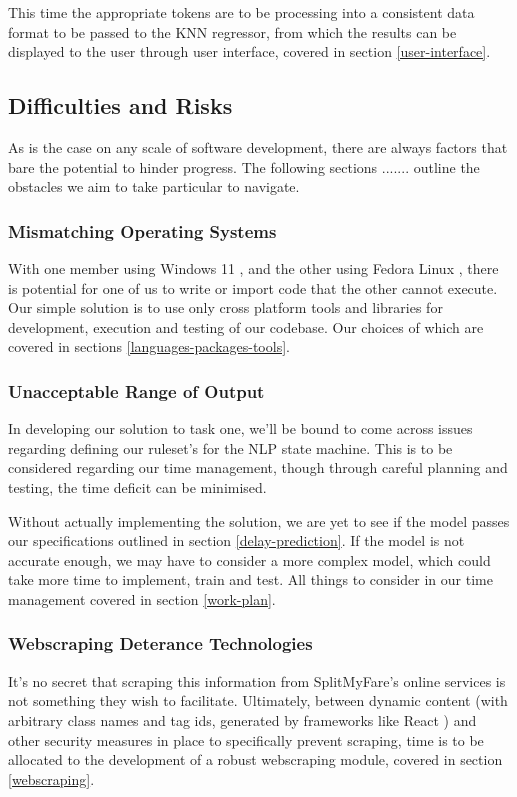 \documentclass[11pt]{article}
\newcounter{subsubsubsection}[subsubsection]
\begin{document}
This time the appropriate tokens are to be processing into a consistent data format to be passed to the KNN regressor, from which the results can be displayed to the user through user interface, covered in section \ref{user-interface}.

\subsection{Difficulties and Risks} \label{difficulties-risks}

As is the case on any scale of software development, there are always factors that bare the potential to hinder progress. The following sections ....... outline the obstacles we aim to take particular to navigate.

\subsubsection{Mismatching Operating Systems} \label{mismatching-os}

With one member using Windows 11 \cite{windows}, and the other using Fedora Linux \cite{fedora}, there is potential for one of us to write or import code that the other cannot execute. Our simple solution is to use only cross platform tools and libraries for development, execution and testing of our codebase. Our choices of which are covered in sections \ref{languages-packages-tools}.

\subsubsection{Unacceptable Range of Output} \label{unacceptable-output}

In developing our solution to task one, we'll be bound to come across issues regarding defining our ruleset's for the NLP state machine. This is to be considered regarding our time management, though through careful planning and testing, the time deficit can be minimised.

Without actually implementing the solution, we are yet to see if the model passes our specifications outlined in section \ref{delay-prediction}. If the model is not accurate enough, we may have to consider a more complex model, which could take more time to implement, train and test. All things to consider in our time management covered in section \ref{work-plan}.

\subsubsection{Webscraping Deterance Technologies} \label{webscrape-deterance}
It's no secret that scraping this information from SplitMyFare's online services is not something they wish to facilitate. Ultimately, between dynamic content (with arbitrary class names and tag ids, generated by frameworks like React \cite{react}) and other security measures in place to specifically prevent scraping, time is to be allocated to the development of a robust webscraping module, covered in section \ref{webscraping}.
\end{document}
